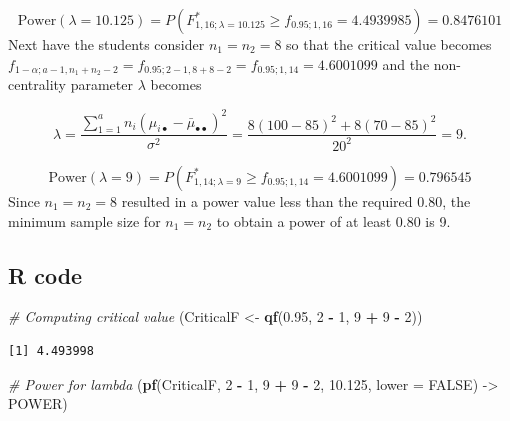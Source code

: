 \documentclass[
]{article}
\newenvironment{Shaded}{\begin{snugshade}}{\end{snugshade}}
\newcommand{\AttributeTok}[1]{\textcolor[rgb]{0.13,0.29,0.53}{#1}}
\newcommand{\CommentTok}[1]{\textcolor[rgb]{0.56,0.35,0.01}{\textit{#1}}}
\newcommand{\ConstantTok}[1]{\textcolor[rgb]{0.56,0.35,0.01}{#1}}
\newcommand{\DecValTok}[1]{\textcolor[rgb]{0.00,0.00,0.81}{#1}}
\newcommand{\FloatTok}[1]{\textcolor[rgb]{0.00,0.00,0.81}{#1}}
\newcommand{\FunctionTok}[1]{\textcolor[rgb]{0.13,0.29,0.53}{\textbf{#1}}}
\newcommand{\NormalTok}[1]{#1}
\newcommand{\OtherTok}[1]{\textcolor[rgb]{0.56,0.35,0.01}{#1}}
\newcommand{\SpecialCharTok}[1]{\textcolor[rgb]{0.81,0.36,0.00}{\textbf{#1}}}
\begin{document}
\[\text{Power}(\lambda = 10.125) = P(F^*_{1, 16; \lambda = 10.125} \geq f_{0.95; 1, 16} = 4.4939985) = 0.8476101\]
Next have the students consider \(n_1 = n_2 = 8\) so that the critical value becomes
\(f_{1 - \alpha; a - 1, n_1 + n_2 -2} = f_{0.95; 2 - 1, 8 + 8 -2} = f_{0.95; 1, 14} = 4.6001099\) and the non-centrality parameter \(\lambda\) becomes

\begin{equation*}
\lambda = \frac{\sum_{1 = 1}^an_i(\mu_{i\bullet} - \bar{\mu}_{\bullet\bullet})^2}{\sigma^2} = \frac{8(100 - 85)^2 + 8(70 - 85)^2}{20^2} = 9.
\end{equation*}

\[\text{Power}(\lambda = 9) = P(F^*_{1, 14; \lambda = 9} \geq f_{0.95; 1, 14} = 4.6001099) = 0.796545\]
Since \(n_1 = n_2 = 8\) resulted in a power value less than the required 0.80, the minimum sample size for \(n_1 = n_2\) to obtain a power of at least 0.80 is 9.

\hypertarget{r-code-1}{%
\subsection*{R code}\label{r-code-1}}

\begin{Shaded}
\begin{Highlighting}[]
\CommentTok{\# Computing critical value}
\NormalTok{(CriticalF }\OtherTok{\textless{}{-}} \FunctionTok{qf}\NormalTok{(}\FloatTok{0.95}\NormalTok{, }\DecValTok{2} \SpecialCharTok{{-}} \DecValTok{1}\NormalTok{, }\DecValTok{9} \SpecialCharTok{+} \DecValTok{9} \SpecialCharTok{{-}} \DecValTok{2}\NormalTok{))}
\end{Highlighting}
\end{Shaded}

\begin{verbatim}
[1] 4.493998
\end{verbatim}

\begin{Shaded}
\begin{Highlighting}[]
\CommentTok{\# Power for lambda}
\NormalTok{(}\FunctionTok{pf}\NormalTok{(CriticalF, }\DecValTok{2} \SpecialCharTok{{-}} \DecValTok{1}\NormalTok{, }\DecValTok{9} \SpecialCharTok{+} \DecValTok{9} \SpecialCharTok{{-}} \DecValTok{2}\NormalTok{, }\FloatTok{10.125}\NormalTok{, }\AttributeTok{lower =} \ConstantTok{FALSE}\NormalTok{) }\OtherTok{{-}\textgreater{}}\NormalTok{ POWER)}
\end{Highlighting}
\end{Shaded}
\end{document}
